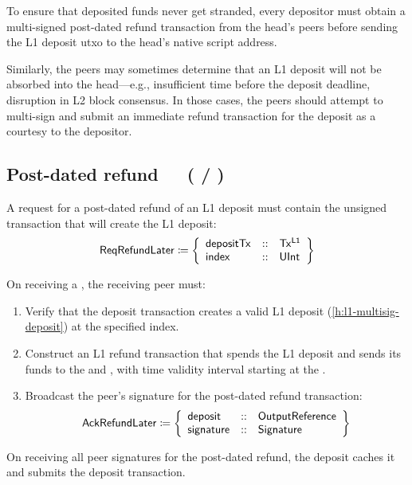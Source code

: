 \documentclass[../hydrozoa.tex]{subfiles}
\begin{document}
To ensure that deposited funds never get stranded, every depositor must obtain a multi-signed post-dated refund transaction from the head's peers before sending the L1 deposit utxo to the head's native script address.

Similarly, the peers may sometimes determine that an L1 deposit will not be absorbed into the head---e.g., insufficient time before the deposit deadline, disruption in L2 block consensus.
In those cases, the peers should attempt to multi-sign and submit an immediate refund transaction for the deposit as a courtesy to the depositor.

\subsection{Post-dated refund~~~( / )}%
\label{h:l2-consensus-post-dated-refund}%

A request for a post-dated refund of an L1 deposit must contain the unsigned transaction that will create the L1 deposit:
\begin{equation*}
  \mathsf{ReqRefundLater} \coloneq \left\{
  \begin{array}{lll}
    \mathsf{depositTx} &::& \mathsf{Tx^{L1}} \\
    \mathsf{index} &::& \mathsf{UInt}
  \end{array}\right\}
\end{equation*}

On receiving a , the receiving peer must:
\begin{enumerate}
  \item Verify that the deposit transaction creates a valid L1 deposit (\cref{h:l1-multisig-deposit}) at the specified index.
  \item Construct an L1 refund transaction that spends the L1 deposit and sends its funds to the  and , with time validity interval starting at the .
  \item Broadcast the peer's signature for the post-dated refund transaction:
    \begin{equation*}
      \mathsf{AckRefundLater} \coloneq \left\{
      \begin{array}{lll}
        \mathsf{deposit} &::& \mathsf{OutputReference} \\
        \mathsf{signature} &::& \mathsf{Signature}
      \end{array}\right\}
    \end{equation*}
\end{enumerate}
On receiving all peer signatures for the post-dated refund, the deposit caches it and submits the deposit transaction.
\end{document}
